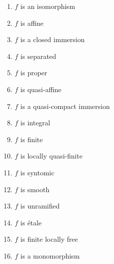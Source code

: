 \begin{proposition}
\begin{enumerate}
        \item $f$ is an isomorphism
        \item $f$ is affine
        \item $f$ is a closed immersion
        \item $f$ is separated
        \item $f$ is proper
        \item $f$ is quasi-affine
        \item $f$ is a quasi-compact immersion
        \item $f$ is integral
        \item $f$ is finite
        \item $f$ is locally quasi-finite
        \item $f$ is syntomic
        \item $f$ is smooth
        \item $f$ is unramified
        \item $f$ is \'etale
        \item $f$ is finite locally free
        \item $f$ is a monomorphism
    \end{enumerate}
\end{proposition}